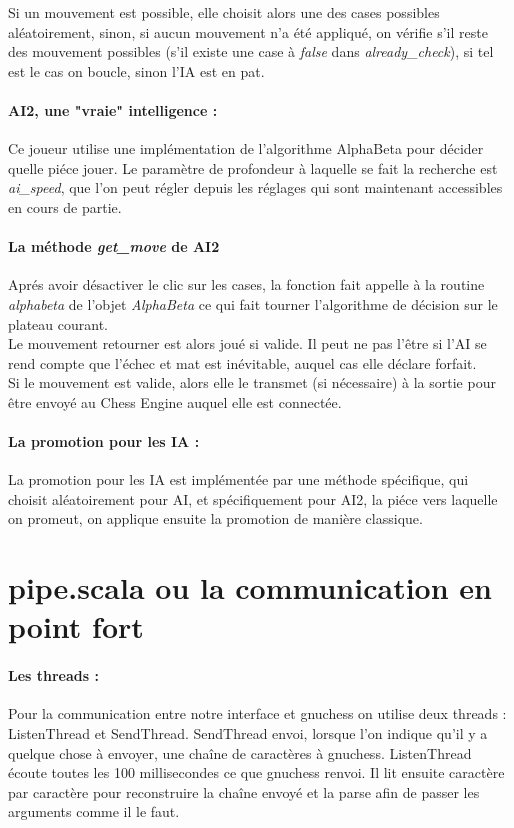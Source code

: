\documentclass[a4paper]{article}
\begin{document}
Si un mouvement est possible, elle choisit alors une des cases possibles aléatoirement, sinon, si aucun mouvement n'a été appliqué, on vérifie s'il reste des mouvement possibles (s'il existe une case à \textit{false} dans \textit{already\_check}), si tel est le cas on boucle, sinon l'IA est en pat. 

\paragraph{AI2, une "vraie" intelligence :}Ce joueur utilise une implémentation de l'algorithme AlphaBeta pour décider quelle piéce jouer. Le paramètre de profondeur à laquelle se fait la recherche est \textit{ai\_speed}, que l'on peut régler depuis les réglages qui sont maintenant accessibles en cours de partie.

\paragraph{La méthode \textit{get\_move} de AI2} Aprés avoir désactiver le clic sur les cases, la fonction fait appelle à la routine \textit{alphabeta} de l'objet \textit{AlphaBeta} ce qui fait tourner l'algorithme de décision sur le plateau courant.\\
Le mouvement retourner est alors joué si valide. Il peut ne pas l'être si l'AI se rend compte que l'échec et mat est inévitable, auquel cas elle déclare forfait.\\
Si le mouvement est valide, alors elle le transmet (si nécessaire) à la sortie pour être envoyé au Chess Engine auquel elle est connectée.

\paragraph{La promotion pour les IA :}La promotion pour les IA est implémentée par une méthode spécifique, qui choisit aléatoirement pour AI, et spécifiquement pour AI2, la piéce vers laquelle on promeut, on applique ensuite la promotion de manière classique.

\section{pipe.scala ou la communication en point fort}

\paragraph{Les threads :}Pour la communication entre notre interface et gnuchess on utilise deux threads : ListenThread et SendThread. SendThread envoi, lorsque l'on indique qu'il y a quelque chose à envoyer, une chaîne de caractères à gnuchess. ListenThread écoute toutes les 100 millisecondes ce que gnuchess renvoi. Il lit ensuite caractère par caractère pour reconstruire la chaîne envoyé et la parse afin de passer les arguments comme il le faut. 
\end{document}
